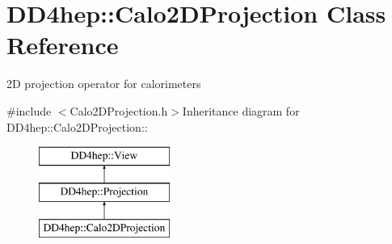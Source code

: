 \hypertarget{class_d_d4hep_1_1_calo2_d_projection}{
\section{DD4hep::Calo2DProjection Class Reference}
\label{class_d_d4hep_1_1_calo2_d_projection}
}


2D projection operator for calorimeters  


{\ttfamily \#include $<$Calo2DProjection.h$>$}Inheritance diagram for DD4hep::Calo2DProjection::\begin{figure}[H]
\begin{center}
\leavevmode
\includegraphics[height=3cm]{class_d_d4hep_1_1_calo2_d_projection}
\end{center}
\end{figure}
